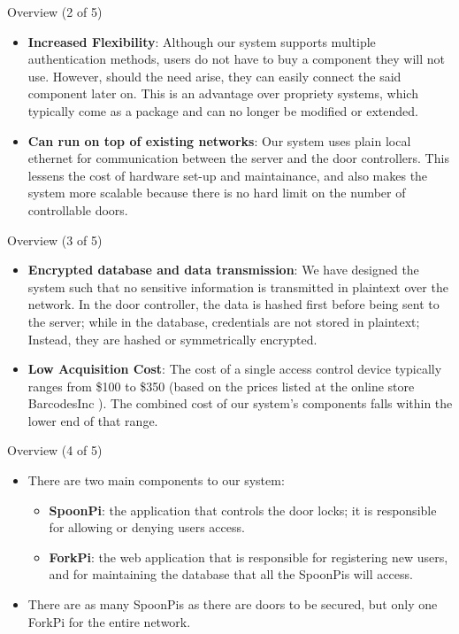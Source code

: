\begin{frame}{Overview (2 of 5)}
\begin{itemize}
	\item<1-> \textbf{Increased Flexibility}: Although our system supports multiple authentication methods, users do not have to buy a component they will not use. However, should the need arise, they can easily connect the said component later on. This is an advantage over propriety systems, which typically come as a package and can no longer be modified or extended.
	\item<2-> \textbf{Can run on top of existing networks}: Our system uses plain local ethernet for communication between the server and the door controllers. This lessens the cost of hardware set-up and maintainance, and also makes the system more scalable because there is no hard limit on the number of controllable doors.
\end{itemize}
\end{frame}

\begin{frame}{Overview (3 of 5)}
\begin{itemize}
	\item<1-> \textbf{Encrypted database and data transmission}: We have designed the system such that no sensitive information is transmitted in plaintext over the network. In the door controller, the data is hashed first before being sent to the server; while in the database, credentials are not stored in plaintext; Instead, they are hashed or symmetrically encrypted.
	\item<2-> \textbf{Low Acquisition Cost}: The cost of a single access control device typically ranges from \$100 to \$350 (based on the prices listed at the online store BarcodesInc ). The combined cost of our system's components falls within the lower end of that range.
\end{itemize}
\end{frame}

\begin{frame}{Overview (4 of 5)}
\begin{itemize}
	\item<1-> There are two main components to our system:
	\begin{itemize}
		\item<2-> \textbf{SpoonPi}: the application that controls the door locks; it is responsible for allowing or denying users access.
		\item<3-> \textbf{ForkPi}: the web application that is responsible for registering new users, and for maintaining the database that all the SpoonPis will access.
	\end{itemize}
	\item<4-> There are as many SpoonPis as there are doors to be secured, but only one ForkPi for the entire network.
\end{itemize}
\end{frame}

